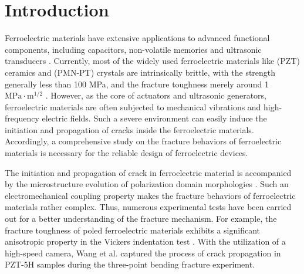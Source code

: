\documentclass[times,fleqn,11pt]{elsarticle}
\begin{document}

\section{Introduction}

Ferroelectric materials have extensive applications to advanced functional components, including capacitors,  non-volatile memories and ultrasonic transducers \cite{martin_thin-film_2017}. Currently, most of the widely used ferroelectric materials like  (PZT) ceramics and  (PMN-PT) crystals are intrinsically brittle, with the strength generally less than 100 MPa, and the fracture toughness merely around {1 $\mathrm{MPa}\cdot\mathrm{m}^{1/2}$} \cite{schneider_influence_2007}. However, as the core of actuators and ultrasonic generators,  ferroelectric materials are often subjected to mechanical vibrations and high-frequency electric fields. Such a severe environment can easily induce the initiation and propagation of cracks inside the ferroelectric materials. Accordingly, a comprehensive study on the fracture behaviors of ferroelectric materials is necessary for the reliable design of ferroelectric devices. 

The initiation and propagation of crack in ferroelectric material is accompanied by the microstructure evolution of polarization domain morphologies \cite{yingwei_influence_2020}. Such an electromechanical coupling property makes the fracture behaviors of ferroelectric materials rather complex. Thus, numerous experimental tests have been carried out for a better understanding of the fracture mechanism. For example, the fracture toughness of poled ferroelectric materials exhibits a significant anisotropic property in the Vickers indentation test \cite{yamamoto_internal_1983,okazaki_electro-mechanical_1992,lynch_crack_1995}. With the utilization of a high-speed camera, Wang et al. \cite{wang_influence_2020} captured the process of crack propagation in PZT-5H samples during the three-point bending fracture experiment. 
\end{document}

